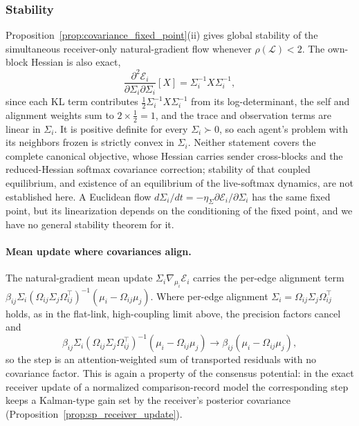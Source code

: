 \subsubsection{Stability}

Proposition~\ref{prop:covariance_fixed_point}(ii) gives global stability of the simultaneous receiver-only natural-gradient flow whenever $\rho(\mathcal{L}) < 2$. The own-block Hessian is also exact,
\begin{equation}
\frac{\partial^2 \mathcal{E}_i}{\partial \Sigma_i \partial \Sigma_i}[X]
= \Sigma_i^{-1} X \Sigma_i^{-1},
\end{equation}
since each KL term contributes $\tfrac{1}{2}\Sigma_i^{-1}X\Sigma_i^{-1}$ from its log-determinant, the self and alignment weights sum to $2 \times \tfrac{1}{2} = 1$, and the trace and observation terms are linear in $\Sigma_i$. It is positive definite for every $\Sigma_i \succ 0$, so each agent's problem with its neighbors frozen is strictly convex in $\Sigma_i$. Neither statement covers the complete canonical objective, whose Hessian carries sender cross-blocks and the reduced-Hessian softmax covariance correction; stability of that coupled equilibrium, and existence of an equilibrium of the live-softmax dynamics, are not established here. A Euclidean flow $d\Sigma_i/dt = -\eta_\Sigma\partial\mathcal{E}_i/\partial\Sigma_i$ has the same fixed point, but its linearization depends on the conditioning of the fixed point, and we have no general stability theorem for it.

\paragraph{Mean update where covariances align.}
The natural-gradient mean update $\Sigma_i\nabla_{\mu_i}\mathcal{E}_i$ carries the per-edge alignment term $\beta_{ij} \Sigma_i (\Omega_{ij}\Sigma_j\Omega_{ij}^\top)^{-1}(\mu_i - \Omega_{ij}\mu_j)$. Where per-edge alignment $\Sigma_i = \Omega_{ij}\Sigma_j\Omega_{ij}^\top$ holds, as in the flat-link, high-coupling limit above, the precision factors cancel and
\begin{equation}
\beta_{ij} \Sigma_i (\Omega_{ij}\Sigma_j\Omega_{ij}^\top)^{-1}(\mu_i - \Omega_{ij}\mu_j) \longrightarrow \beta_{ij}(\mu_i - \Omega_{ij}\mu_j),
\end{equation}
so the step is an attention-weighted sum of transported residuals with no covariance factor. This is again a property of the consensus potential: in the exact receiver update of a normalized comparison-record model the corresponding step keeps a Kalman-type gain set by the receiver's posterior covariance (Proposition~\ref{prop:sp_receiver_update}).

